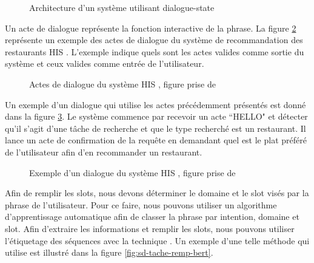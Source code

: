 \documentclass{KodeBook}
\begin{document}
\begin{figure}[!ht]
	\centering
	\caption[Architecture d'un système utilisant dialogue-state]{Architecture d'un système utilisant dialogue-state \cite{2016-williams-al}}
	\label{fig:sd-tache-dial-state}
\end{figure}

Un acte de dialogue représente la fonction interactive de la phrase. 
La figure \ref{fig:sd-tache-his-acts} représente un exemple des actes de dialogue du système de recommandation des restaurants HIS \cite{2010-young-al}. 
L'exemple indique quels sont les actes valides comme sortie du système et ceux valides comme entrée de l'utilisateur. 

\begin{figure}[!ht]
	\centering
	\caption[Actes de dialogue du système HIS]{Actes de dialogue du système HIS \cite{2010-young-al}, figure prise de \cite{2020-jurafsky-martin}}
	\label{fig:sd-tache-his-acts}
\end{figure}

Un exemple d'un dialogue qui utilise les actes précédemment présentés est donné dans la figure \ref{fig:sd-tache-his-exp}.
Le système commence par recevoir un acte ``HELLO" et détecter qu'il s'agit d'une tâche de recherche et que le type recherché est un restaurant. 
Il lance un acte de confirmation de la requête en demandant quel est le plat préféré de l'utilisateur afin d'en recommander un restaurant. 

\begin{figure}[!ht]
	\centering
	\vspace{-6pt}
	\caption[Exemple d'un dialogue du système HIS]{Exemple d'un dialogue du système HIS \cite{2010-young-al}, figure prise de \cite{2020-jurafsky-martin}}
	\label{fig:sd-tache-his-exp}
\end{figure}

Afin de remplir les slots, nous devons déterminer le domaine et le slot visés par la phrase de l'utilisateur. 
Pour ce faire, nous pouvons utiliser un algorithme d'apprentissage automatique afin de classer la phrase par intention, domaine et slot. 
Afin d'extraire les informations et remplir les slots, nous pouvons utiliser l'étiquetage des séquences avec la technique . 
Un exemple d'une telle méthode qui utilise  est illustré dans la figure \ref{fig:sd-tache-remp-bert}. 
\end{document}

